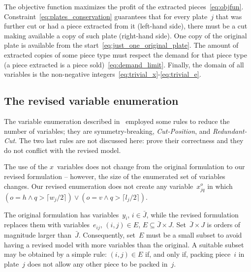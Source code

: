 \documentclass[runningheads]{llncs}
\begin{document}
The objective function maximizes the profit of the extracted pieces~\eqref{eq:objfun}.
Constraint~\eqref{eq:plates_conservation} guarantees that for every plate~\(j\) that was further cut or had a piece extracted from it (left-hand side), there must be a cut making available a copy of such plate (right-hand side).
One copy of the original plate is available from the start~\eqref{eq:just_one_original_plate}.
The amount of extracted copies of some piece type must respect the demand for that piece type (a piece extracted is a piece sold)~\eqref{eq:demand_limit}.
Finally, the domain of all variables is the non-negative integers~\eqref{eq:trivial_x}-\eqref{eq:trivial_e}.

\subsection{The revised variable enumeration}

The variable enumeration described in~\cite{furini:2016} employed some rules to reduce the number of variables; they are symmetry-breaking, \emph{Cut-Position}, and \emph{Redundant-Cut}.
The two last rules are not discussed here: \cite{furini:2016} prove their correctness and they do not conflict with the revised model.

The use of the \(x\)~variables does not change from the original formulation to our revised formulation -- however, the size of the enumerated set of variables changes.
Our revised enumeration does not create any variable~\(x^o_{jq}\) in which \((o = h \land q > \lceil w_j / 2 \rceil) \lor (o = v \land q > \lceil l_j / 2 \rceil)\).

The original formulation has variables~\(y_i\), \(i \in \bar{J}\), while the revised formulation replaces them with variables~\(e_{ij}\), \((i, j) \in E\), \(E \subseteq \bar{J} \times J\).
Set~\(\bar{J} \times J\) is orders of magnitude larger than~\(\bar{J}\).
Consequently, set~\(E\) must be a small subset to avoid having a revised model with more variables than the original.
A suitable subset may be obtained by a simple rule: \((i, j) \in E\) if, and only if, packing piece~\(i\) in plate~\(j\) does not allow any other piece to be packed in~\(j\).

\end{document}
